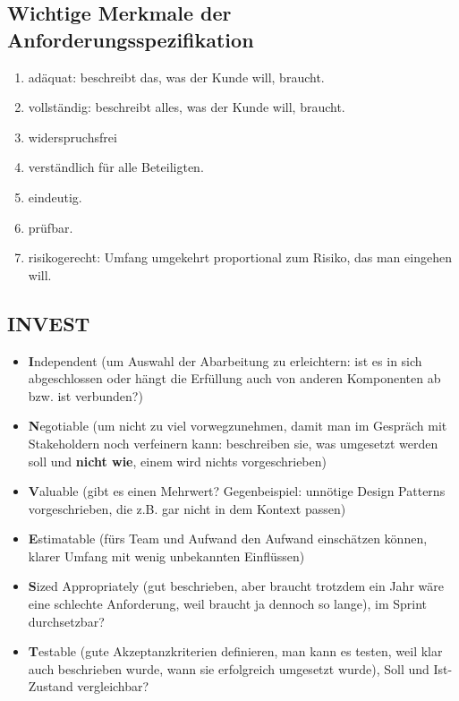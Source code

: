 \documentclass{book}
\begin{document}
    \subsection{Wichtige Merkmale der Anforderungsspezifikation}
    \begin{enumerate}
        \item adäquat: beschreibt das, was der Kunde will, braucht.
        \item vollständig: beschreibt alles, was der Kunde will, braucht.
        \item widerspruchsfrei
        \item verständlich für alle Beteiligten.
        \item eindeutig.
        \item prüfbar.
        \item risikogerecht: Umfang umgekehrt proportional zum Risiko, das man eingehen will.
    \end{enumerate}

    \subsection{\textbf{INVEST}}
    \begin{itemize}
        \item \textbf{I}ndependent (um Auswahl der Abarbeitung zu erleichtern: ist es in sich abgeschlossen oder hängt die Erfüllung auch von anderen Komponenten ab bzw. ist verbunden?)
        \item \textbf{N}egotiable (um nicht zu viel vorwegzunehmen, damit man im Gespräch mit Stakeholdern noch verfeinern kann: beschreiben sie, was umgesetzt werden soll und \textbf{nicht wie}, einem wird nichts vorgeschrieben)
        \item \textbf{V}aluable (gibt es einen Mehrwert? Gegenbeispiel: unnötige Design Patterns vorgeschrieben, die z.B. gar nicht in dem Kontext passen)
        \item \textbf{E}stimatable (fürs Team und Aufwand den Aufwand einschätzen können, klarer Umfang mit wenig unbekannten Einflüssen)
        \item \textbf{S}ized Appropriately (gut beschrieben, aber braucht trotzdem ein Jahr wäre eine schlechte Anforderung, weil braucht ja dennoch so lange), im Sprint durchsetzbar?
        \item \textbf{T}estable (gute Akzeptanzkriterien definieren, man kann es testen, weil klar auch beschrieben wurde, wann sie erfolgreich umgesetzt wurde), Soll und Ist- Zustand vergleichbar?
    \end{itemize}
\end{document}

